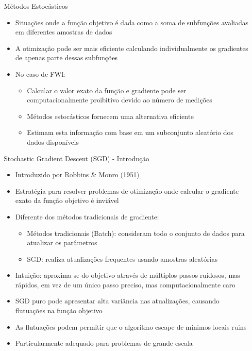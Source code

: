 \documentclass[aspectratio=1610]{beamer}
\begin{document}
\begin{frame}{Métodos Estocásticos}
\begin{itemize}
    \item Situações onde a função objetivo é dada como a soma de subfunções avaliadas em diferentes amostras de dados
    \item A otimização pode ser mais eficiente calculando individualmente os gradientes de apenas parte dessas subfunções
    \item No caso de FWI:
    \begin{itemize}
        \item Calcular o valor exato da função e gradiente pode ser computacionalmente proibitivo devido ao número de medições
        \item Métodos estocásticos fornecem uma alternativa eficiente
        \item Estimam esta informação com base em um subconjunto aleatório dos dados disponíveis
    \end{itemize}
\end{itemize}
\end{frame}

\begin{frame}{Stochastic Gradient Descent (SGD) - Introdução}
\begin{itemize}
    \item Introduzido por Robbins \& Monro (1951)
    \item Estratégia para resolver problemas de otimização onde calcular o gradiente exato da função objetivo é inviável
    \item Diferente dos métodos tradicionais de gradiente:
    \begin{itemize}
        \item Métodos tradicionais (Batch): consideram todo o conjunto de dados para atualizar os parâmetros
        \item SGD: realiza atualizações frequentes usando amostras aleatórias
    \end{itemize}
    \item Intuição: aproxima-se do objetivo através de múltiplos passos ruidosos, mas rápidos, em vez de um único passo preciso, mas computacionalmente caro
    \item SGD puro pode apresentar alta variância nas atualizações, causando flutuações na função objetivo
    \item As flutuações podem permitir que o algoritmo escape de mínimos locais ruins
    \item Particularmente adequado para problemas de grande escala
\end{itemize}
\end{frame}
\end{document}
